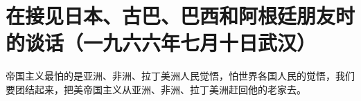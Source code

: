 \section[在接见日本、古巴、巴西和阿根廷朋友时的谈话（一九六六年七月十日武汉）]{在接见日本、古巴、巴西和阿根廷朋友时的谈话（一九六六年七月十日武汉）}


帝国主义最怕的是亚洲、非洲、拉丁美洲人民觉悟，怕世界各国人民的觉悟，我们要团结起来，把美帝国主义从亚洲、非洲、拉丁美洲赶回他的老家去。

